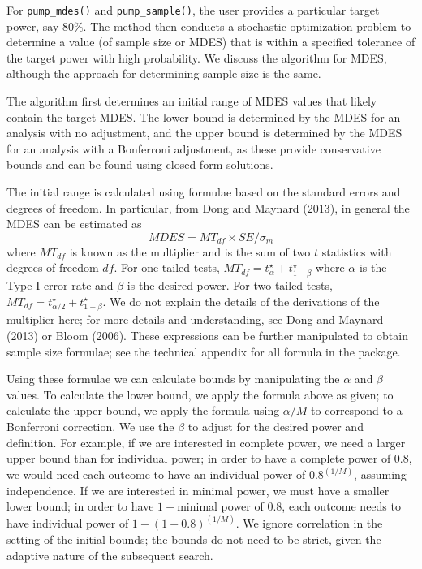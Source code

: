 \documentclass[
]{article}
\begin{document}
For \texttt{pump\_mdes()} and \texttt{pump\_sample()}, the user provides
a particular target power, say \(80\%\). The method then conducts a
stochastic optimization problem to determine a value (of sample size or
MDES) that is within a specified tolerance of the target power with high
probability. We discuss the algorithm for MDES, although the approach
for determining sample size is the same.

The algorithm first determines an initial range of MDES values that
likely contain the target MDES. The lower bound is determined by the
MDES for an analysis with no adjustment, and the upper bound is
determined by the MDES for an analysis with a Bonferroni adjustment, as
these provide conservative bounds and can be found using closed-form
solutions.

The initial range is calculated using formulae based on the standard
errors and degrees of freedom. In particular, from Dong and Maynard
(2013), in general the MDES can be estimated as
\[ MDES = MT_{df} \times SE / \sigma_{m} \] where \(MT_{df}\) is known
as the multiplier and is the sum of two \(t\) statistics with degrees of
freedom \(df\). For one-tailed tests,
\(MT_{df} = t_{\alpha}^\star + t_{1-\beta}^\star\) where \(\alpha\) is
the Type I error rate and \(\beta\) is the desired power. For two-tailed
tests, \(MT_{df} = t_{\alpha/2}^\star + t_{1-\beta}^\star\). We do not
explain the details of the derivations of the multiplier here; for more
details and understanding, see Dong and Maynard (2013) or Bloom (2006).
These expressions can be further manipulated to obtain sample size
formulae; see the technical appendix for all formula in the package.

Using these formulae we can calculate bounds by manipulating the
\(\alpha\) and \(\beta\) values. To calculate the lower bound, we apply
the formula above as given; to calculate the upper bound, we apply the
formula using \(\alpha/M\) to correspond to a Bonferroni correction. We
use the \(\beta\) to adjust for the desired power and definition. For
example, if we are interested in complete power, we need a larger upper
bound than for individual power; in order to have a complete power of
\(0.8\), we would need each outcome to have an individual power of
\(\text{0.8}^{(1/M)}\), assuming independence. If we are interested in
minimal power, we must have a smaller lower bound; in order to have
\(1-\)minimal power of \(0.8\), each outcome needs to have individual
power of \(1 - (1 - \text{0.8})^{(1/M)}\). We ignore correlation in the
setting of the initial bounds; the bounds do not need to be strict,
given the adaptive nature of the subsequent search.
\end{document}
